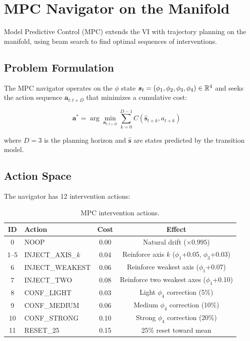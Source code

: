 
\section{MPC Navigator on the Manifold}
\label{sec:mpc}

Model Predictive Control (MPC) extends the VI with trajectory planning
on the manifold, using beam search to find optimal sequences of
interventions.

\subsection{Problem Formulation}

The MPC navigator operates on the $\phi$ state
$\bm{s}_t = (\phi_1, \phi_2, \phi_3, \phi_4) \in \mathbb{R}^4$ and seeks the action sequence
$\bm{a}_{t:t+D}$ that minimizes a cumulative cost:

\begin{equation}
    \bm{a}^* = \arg\min_{\bm{a}_{t:t+D}} \sum_{k=0}^{D-1} C(\hat{\bm{s}}_{t+k}, a_{t+k})
    \label{eq:mpc_objective}
\end{equation}

where $D = 3$ is the planning horizon and $\hat{\bm{s}}$ are states
predicted by the transition model.

\subsection{Action Space}

The navigator has 12 intervention actions:

\begin{table}[H]
\centering
\caption{MPC intervention actions.}
\label{tab:mpc_actions}
\begin{tabular}{clcc}
\toprule
\textbf{ID} & \textbf{Action} & \textbf{Cost} & \textbf{Effect} \\
\midrule
0 & NOOP & 0.00 & Natural drift ($\times 0.995$) \\
1--5 & INJECT\_AXIS\_$k$ & 0.04 & Reinforce axis $k$ ($\phi_1$+0.05, $\phi_3$+0.03) \\
6 & INJECT\_WEAKEST & 0.06 & Reinforce weakest axis ($\phi_1$+0.07) \\
7 & INJECT\_TWO & 0.08 & Reinforce two weakest axes ($\phi_1$+0.10) \\
8 & CONF\_LIGHT & 0.03 & Light $\phi_4$ correction (5\%) \\
9 & CONF\_MEDIUM & 0.06 & Medium $\phi_4$ correction (10\%) \\
10 & CONF\_STRONG & 0.10 & Strong $\phi_4$ correction (20\%) \\
11 & RESET\_25 & 0.15 & 25\% reset toward mean \\
\bottomrule
\end{tabular}
\end{table}


